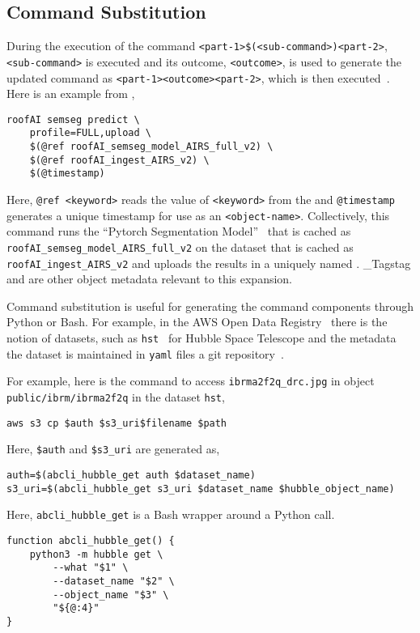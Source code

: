 \subsection{Command Substitution}
\label{command_substitution}

During the execution of the command \texttt{<part-1>\$(<sub-command>)<part-2>}, \texttt{<sub-command>} is executed and its outcome, \texttt{<outcome>}, is used to generate the updated command as \texttt{<part-1><outcome><part-2>}, which is then executed~. Here is an example from ,
%
\begin{verbatim}
roofAI semseg predict \
    profile=FULL,upload \
    $(@ref roofAI_semseg_model_AIRS_full_v2) \
    $(@ref roofAI_ingest_AIRS_v2) \
    $(@timestamp)
\end{verbatim}
%
Here, \texttt{@ref <keyword>} reads the value of \texttt{<keyword>} from the  and \texttt{@timestamp} generates a unique timestamp for use as an \texttt{<object-name>}. Collectively, this command runs the \enquote{Pytorch Segmentation Model}~ that is cached as \texttt{roofAI\_semseg\_model\_AIRS\_full\_v2} on the dataset that is cached as \texttt{roofAI\_ingest\_AIRS\_v2} and uploads the results in a uniquely named . \keyword_{Tags}{tag} and  are other object metadata relevant to this expansion.

Command substitution is useful for generating the command components through Python or Bash. For example, in the AWS Open Data Registry~ there is the notion of datasets, such as \texttt{hst}~ for Hubble Space Telescope and the metadata the dataset is maintained in \texttt{yaml} files a git repository~. 

For example, here is the command to access \texttt{ibrma2f2q\_drc.jpg} in object \texttt{public/ibrm/ibrma2f2q} in the dataset \texttt{hst},
%
\begin{verbatim}
aws s3 cp $auth $s3_uri$filename $path
\end{verbatim}
%
Here, \texttt{\$auth} and \texttt{\$s3\_uri} are generated as,
%
\begin{verbatim}
auth=$(abcli_hubble_get auth $dataset_name)
s3_uri=$(abcli_hubble_get s3_uri $dataset_name $hubble_object_name)
\end{verbatim}
%
Here, \texttt{abcli\_hubble\_get} is a Bash wrapper around a Python call.
%
\begin{verbatim}
function abcli_hubble_get() {
    python3 -m hubble get \
        --what "$1" \
        --dataset_name "$2" \
        --object_name "$3" \
        "${@:4}"
}
\end{verbatim}




